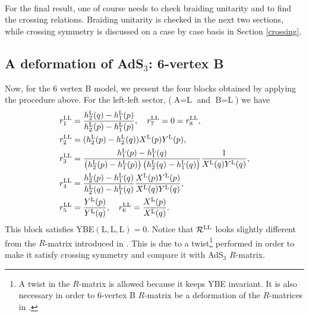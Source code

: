 \documentclass[12pt,a4paper]{article}
\numberwithin{equation}{section}
\newcommand{\lR}{\mathcal{R}}
\newcommand{\tA}{\text{A}}
\newcommand{\tB}{\text{B}}
\newcommand{\tL}{\text{L}}
\begin{document}
\

For the final result, one of course needs to check braiding unitarity and to find the crossing relations. Braiding unitarity is checked in the next two sections, while crossing symmetry is discussed on a case by case basis in Section \ref{crossing}.

\subsection{A deformation of AdS$_3 $: 6-vertex B}\label{subsec:full6vB}

Now, for the 6 vertex B model, we present the four blocks obtained by applying the procedure above. 
For the left-left sector, ($ \tA=\tL $ and $ \tB=\tL $) we have
%
\begin{align}
& r_1^{{\rm LL}}=\frac{h_2^{{\rm L}}(q)-h_1^{{\rm L}}(p)}{h_2^{{\rm L}}(p)-h_1^{{\rm L}}(p)},\quad r_7^{{\rm LL}}=0=r_8^{{\rm LL}},\\
& r_2^{{\rm LL}}=(h_2^{{\rm L}}(p)-h_2^{{\rm L}}(q))X^{{\rm L}}(p)Y^{{\rm L}}(p),\\
& r_3^{{\rm LL}}=\frac{h_1^{{\rm L}}(p)-h_1^{{\rm L}}(q)}{\left(h_2^{{\rm L}}(p)-h_1^{{\rm L}}(p)\right)\left(h_2^{{\rm L}}(q)-h_1^{{\rm L}}(q)\right)}\frac{1}{X^{{\rm L}}(q)Y^{{\rm L}}(q)},\\
& r_4^{{\rm LL}}=\frac{h_2^{{\rm L}}(p)-h_1^{{\rm L}}(q)}{h_2^{{\rm L}}(q)-h_1^{{\rm L}}(q)}\frac{X^{{\rm L}}(p)Y^{{\rm L}}(p)}{X^{{\rm L}}(q)Y^{{\rm L}}(q)},\\
& r_5^{{\rm LL}}=\frac{Y^{{\rm L}}(p)}{Y^{{\rm L}}(q)},\quad r_6^{{\rm LL}}=\frac{X^{{\rm L}}(p)}{X^{{\rm L}}(q)}.
\end{align}
%
This block satisfies YBE$ (\tL,\tL,\tL)=0 $. Notice that $ \lR^{{\rm LL}} $ looks slightly different from the $ R $-matrix introduced in \cite{deLeeuw:2020ahe}. This is due to a twist\footnote{A twist in the $ R $-matrix is allowed because it keeps YBE invariant. It is also necessary in order to 6-vertex B $ R $-matrix be a deformation of  the $ R $-matrices in \cite{Sfondrini:2014via,Borsato:2014exa,Borsato:2015mma,Hoare:2014oua}.} performed in order to make it satisfy crossing symmetry and compare it with AdS$ _3 $ $ R $-matrix.
\end{document}
